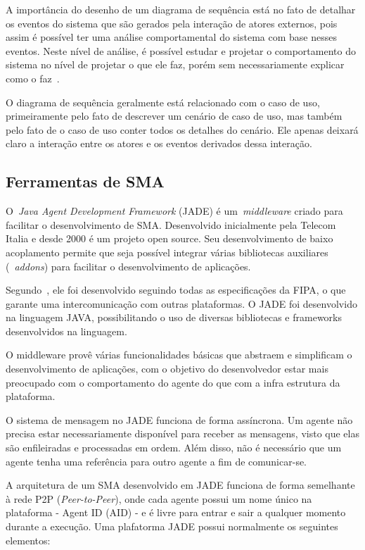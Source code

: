 A importância do desenho de um diagrama de sequência está no fato de detalhar os eventos do sistema que são gerados pela interação de atores externos, pois assim é possível ter uma análise comportamental do sistema com base nesses eventos. Neste nível de análise, é possível estudar e projetar o comportamento do sistema no nível de projetar o que ele faz, porém sem necessariamente explicar como o faz~\cite{larman08}.

O diagrama de sequência geralmente está relacionado com o caso de uso, primeiramente pelo fato de descrever um cenário de caso de uso, mas também pelo fato de o caso de uso conter todos os detalhes do cenário. Ele apenas deixará claro a interação entre os atores e os eventos derivados dessa interação.


\subsection{Ferramentas de SMA}

O~\emph{Java Agent Development Framework} (JADE) é um~\emph{middleware} criado para facilitar o desenvolvimento de SMA. Desenvolvido inicialmente pela Telecom Italia e desde 2000 é um projeto open source. Seu desenvolvimento de baixo acoplamento permite que seja possível integrar várias bibliotecas auxiliares (~\emph{addons}) para facilitar o desenvolvimento de aplicações.

Segundo~\cite{bellifemine07}, ele foi desenvolvido seguindo todas as especificações da FIPA, o que garante uma intercomunicação com outras plataformas. O JADE foi desenvolvido na linguagem JAVA, possibilitando o uso de diversas bibliotecas e frameworks desenvolvidos na linguagem.

O middleware provê várias funcionalidades básicas que abstraem e simplificam o desenvolvimento de aplicações, com o objetivo do desenvolvedor estar mais preocupado com o comportamento do agente do que com a infra estrutura da plataforma.

O sistema de mensagem no JADE funciona de forma assíncrona. Um agente não precisa estar necessariamente disponível para receber as mensagens, visto que elas são enfileiradas e processadas em ordem. Além disso, não é necessário que um agente tenha uma referência para outro agente a fim de comunicar-se.

A arquitetura de um SMA desenvolvido em JADE funciona de forma semelhante à rede P2P (\emph{Peer-to-Peer}), onde cada agente possui um nome único na plataforma - Agent ID (AID) - e é livre para entrar e sair a qualquer momento durante a execução. Uma plafatorma JADE possui normalmente os seguintes elementos:

